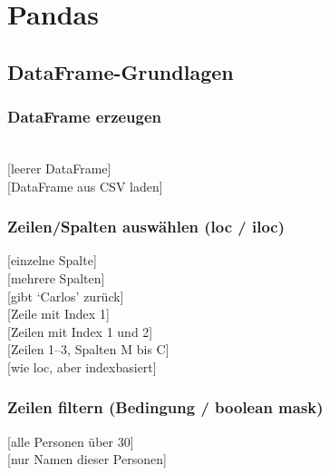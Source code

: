 \section{Pandas}\label{sec:08-pandas}

\subsection{DataFrame-Grundlagen}\label{sec:08-dataframe-grundlagen}
\subsubsection{DataFrame erzeugen}\label{sec:08-dataframe-erzeugen}
\begin{contentbox}
\\
[leerer DataFrame]\\
[DataFrame aus CSV laden]
\end{contentbox}

\subsubsection{Zeilen/Spalten auswählen (loc / iloc)}\label{sec:08-auswählen}
\begin{contentbox}
[einzelne Spalte]\\
[mehrere Spalten]\\
[gibt `Carlos' zurück]\\
\ZSFgapS
{}[Zeile mit Index 1]\\
[Zeilen mit Index 1 und 2]\\
[Zeilen 1--3, Spalten M bis C]\\
[wie loc, aber indexbasiert]
\end{contentbox}

\subsubsection{Zeilen filtern (Bedingung / boolean mask)}\label{sec:08-filtern-von-zeilen}
\begin{contentbox}
[alle Personen über 30]\\
[nur Namen dieser Personen]
\end{contentbox}

